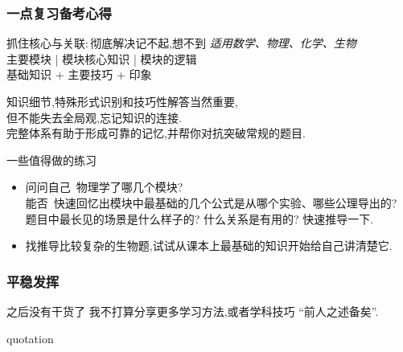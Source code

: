 \documentclass[10pt]{beamer}
\begin{document}
\begin{frame}
	\frametitle{一点复习备考心得}
	\begin{block}{抓住核心与关联:\,彻底解决记不起,想不到}
		\emph{\tiny{适用数学、物理、化学、生物}}\\
		主要模块 |  模块核心知识 | 模块的逻辑\\
		基础知识 + 主要技巧 + 印象\\
	\end{block}

	知识细节,特殊形式识别和技巧性解答当然重要,\\
	但不能失去全局观,忘记知识的连接.\\
	完整体系有助于形成可靠的记忆,并帮你对抗突破常规的题目.\\

	\pause{}

	\begin{example}{一些值得做的练习}
		\begin{itemize}
			\item 问问自己\ 物理学了哪几个模块?\\
				能否\ 快速回忆出模块中最基础的几个公式是从哪个实验、哪些公理导出的?
				题目中最长见的场景是什么样子的? 什么关系是有用的? 快速推导一下.\\
			\item 找推导比较复杂的生物题,试试从课本上最基础的知识开始给自己讲清楚它.
		\end{itemize}
	\end{example}
\end{frame}


\begin{frame}
	\frametitle{平稳发挥}
	\begin{alertblock}{之后没有干货了}
		我不打算分享更多学习方法,或者学科技巧\quad
		``前人之述备矣''.
	\end{alertblock}
	\begin{block}{quotation}
		\\
		\\
		{\ }
		\\
	\end{block}
\end{frame}
\end{document}
